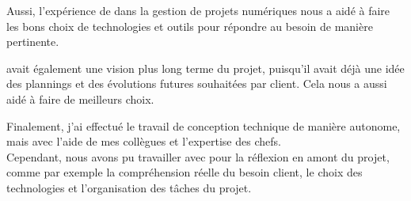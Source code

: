 Aussi, l'expérience de \damien dans la gestion de projets numériques nous a aidé à faire les bons choix de technologies et outils pour répondre au besoin de manière pertinente.

\damien avait également une vision plus long terme du projet, puisqu'il avait déjà une idée des plannings et des évolutions futures souhaitées par client. Cela nous a aussi aidé à faire de meilleurs choix.

Finalement, j'ai effectué le travail de conception technique de manière autonome, mais avec l'aide de mes collègues et l'expertise des chefs.\\
Cependant, nous avons pu travailler avec \damien pour la réflexion en amont du projet, comme par exemple la compréhension réelle du besoin client, le choix des technologies et l'organisation des tâches du projet.